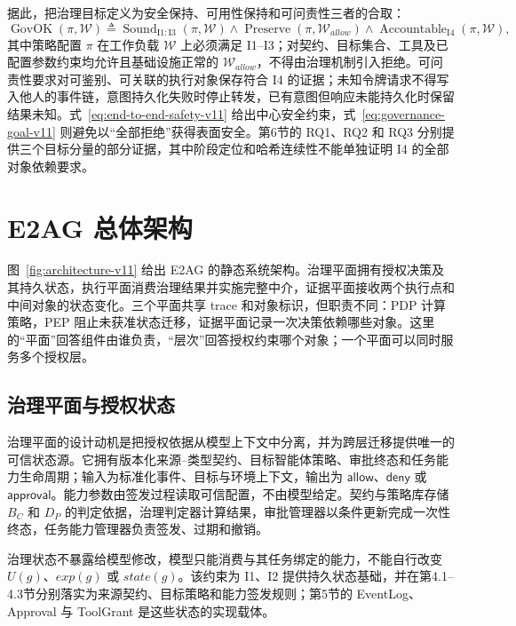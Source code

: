 据此，把治理目标定义为安全保持、可用性保持和可问责性三者的合取：
\begin{equation}
\operatorname{GovOK}(\pi,\mathcal{W})\triangleq
\operatorname{Sound}_{\mathrm{I1:I3}}(\pi,\mathcal{W})\land
\operatorname{Preserve}(\pi,\mathcal{W}_{allow})\land
\operatorname{Accountable}_{\mathrm{I4}}(\pi,\mathcal{W}),
\label{eq:governance-goal-v11}
\end{equation}
其中策略配置 $\pi$ 在工作负载 $\mathcal{W}$ 上必须满足 I1--I3；对契约、目标集合、工具及已配置参数约束均允许且基础设施正常的 $\mathcal{W}_{allow}$，不得由治理机制引入拒绝。可问责性要求对可鉴别、可关联的执行对象保存符合 I4 的证据；未知令牌请求不得写入他人的事件链，意图持久化失败时停止转发，已有意图但响应未能持久化时保留结果未知。式~\eqref{eq:end-to-end-safety-v11} 给出中心安全约束，式~\eqref{eq:governance-goal-v11} 则避免以“全部拒绝”获得表面安全。第6节的 RQ1、RQ2 和 RQ3 分别提供三个目标分量的部分证据，其中阶段定位和哈希连续性不能单独证明 I4 的全部对象依赖要求。

\section{E2AG 总体架构}\label{sec:architecture-v11}



图~\ref{fig:architecture-v11} 给出 E2AG 的静态系统架构。治理平面拥有授权决策及其持久状态，执行平面消费治理结果并实施完整中介，证据平面接收两个执行点和中间对象的状态变化。三个平面共享 trace 和对象标识，但职责不同：PDP 计算策略，PEP 阻止未获准状态迁移，证据平面记录一次决策依赖哪些对象。这里的“平面”回答组件由谁负责，“层次”回答授权约束哪个对象；一个平面可以同时服务多个授权层。

\subsection{治理平面与授权状态}

治理平面的设计动机是把授权依据从模型上下文中分离，并为跨层迁移提供唯一的可信状态源。它拥有版本化来源--类型契约、目标智能体策略、审批终态和任务能力生命周期；输入为标准化事件、目标与环境上下文，输出为 $\mathsf{allow}$、$\mathsf{deny}$ 或 $\mathsf{approval}$。能力参数由签发过程读取可信配置，不由模型给定。契约与策略库存储 $B_C$ 和 $D_P$ 的判定依据，治理判定器计算结果，审批管理器以条件更新完成一次性终态，任务能力管理器负责签发、过期和撤销。

治理状态不暴露给模型修改，模型只能消费与其任务绑定的能力，不能自行改变 $U(g)$、$exp(g)$ 或 $state(g)$。该约束为 I1、I2 提供持久状态基础，并在第4.1--4.3节分别落实为来源契约、目标策略和能力签发规则；第5节的 EventLog、Approval 与 ToolGrant 是这些状态的实现载体。


